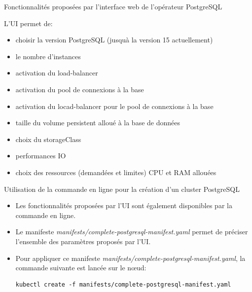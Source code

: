 \begin{frame}[fragile]{Fonctionnalités proposées par l'interface web de l'opérateur PostgreSQL}

L'UI permet de:
\begin{itemize}
   \item choisir la version PostgreSQL (jusquà la version 15 actuellement)
   \item le nombre d'instances
   \item activation du load-balancer
   \item activation du pool de connexions à la base
   \item activation du locad-balancer pour le pool de connexions à la base
   \item taille du volume persistent alloué à la base de données
   \item choix du storageClass
   \item performances IO
   \item choix des ressources (demandées et limites) CPU et RAM allouées
\end{itemize}

\end{frame}


\begin{frame}[fragile]{Utilisation de la commande en ligne pour la création d'un cluster PostgreSQL}

   \begin{itemize}
      \item Les fonctionnalités proposées par l'UI sont également disponibles par la commande en ligne.
      \item Le manifeste \textit{manifests/complete-postgresql-manifest.yaml} permet de préciser l'ensemble des paramètres proposés par l'UI.
      \item Pour appliquer ce manifeste \textit{manifests/complete-postgresql-manifest.yaml}, la commande suivante est lancée sur le n\oe{}ud:
\begin{tiny}
\begin{Verbatim}[commandchars=\&\{\}]
kubectl create -f manifests/complete-postgresql-manifest.yaml
\end{Verbatim}
\end{tiny}
   \end{itemize}

\end{frame}

